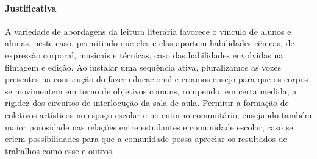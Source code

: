 \documentclass[12pt]{extarticle}
\begin{document}
\paragraph{Justificativa}
A variedade de abordagens da leitura literária favorece o vínculo de
alunos e alunas, neste caso, permitindo que eles e elas aportem
habilidades cênicas, de expressão corporal, musicais e técnicas, caso
das habilidades envolvidas na filmagem e edição. Ao instalar uma
sequência ativa, pluralizamos as vozes presentes na construção do fazer
educacional e criamos ensejo para que os corpos se movimentem em torno
de objetivos comuns, rompendo, em certa medida, a rigidez dos circuitos
de interlocução da sala de aula. Permitir a formação de coletivos
artísticos no espaço escolar e no entorno comunitário, ensejando também
maior porosidade nas relações entre estudantes e comunidade escolar,
caso se criem possibilidades para que a comunidade possa apreciar os
resultados de trabalhos como esse e outros.
\end{document}
